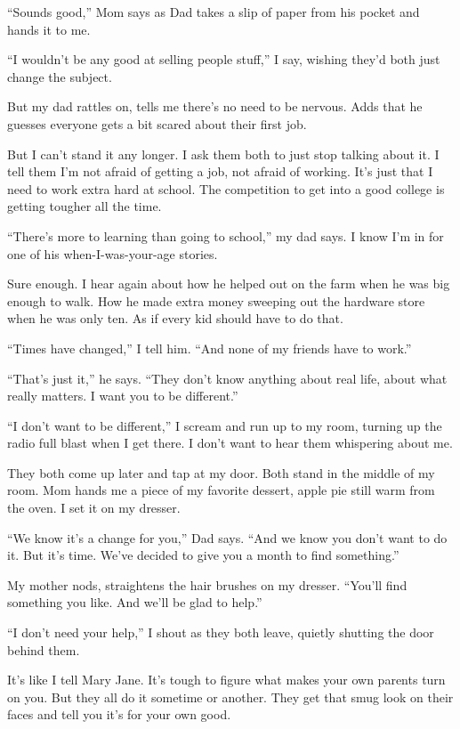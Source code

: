 \documentclass[
]{article}
\begin{document}
``Sounds good,'' Mom says as Dad takes a slip of paper from his pocket
and hands it to me.

``I wouldn't be any good at selling people stuff,'' I say, wishing
they'd both just change the subject.

But my dad rattles on, tells me there's no need to be nervous. Adds that
he guesses everyone gets a bit scared about their first job.

But I can't stand it any longer. I ask them both to just stop talking
about it. I tell them I'm not afraid of getting a job, not afraid of
working. It's just that I need to work extra hard at school. The
competition to get into a good college is getting tougher all the time.

``There's more to learning than going to school,'' my dad says. I know
I'm in for one of his when-I-was-your-age stories.

Sure enough. I hear again about how he helped out on the farm when he
was big enough to walk. How he made extra money sweeping out the
hardware store when he was only ten. As if every kid should have to do
that.

``Times have changed,'' I tell him. ``And none of my friends have to
work.''

``That's just it,'' he says. ``They don't know anything about real life,
about what really matters. I want you to be different.''

``I don't want to be different,'' I scream and run up to my room,
turning up the radio full blast when I get there. I don't want to hear
them whispering about me.

They both come up later and tap at my door. Both stand in the middle of
my room. Mom hands me a piece of my favorite dessert, apple pie still
warm from the oven. I set it on my dresser.

``We know it's a change for you,'' Dad says. ``And we know you don't
want to do it. But it's time. We've decided to give you a month to find
something.''

My mother nods, straightens the hair brushes on my dresser. ``You'll
find something you like. And we'll be glad to help.''

``I don't need your help,'' I shout as they both leave, quietly shutting
the door behind them.

It's like I tell Mary Jane. It's tough to figure what makes your own
parents turn on you. But they all do it sometime or another. They get
that smug look on their faces and tell you it's for your own good.
\end{document}
